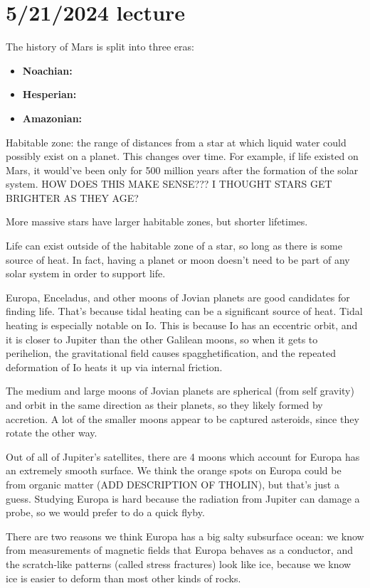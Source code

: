 \documentclass[class=article, crop=false]{standalone}
\begin{document}
\section{5/21/2024 lecture}
The history of Mars is split into three eras:
\begin{itemize}
    \item \textbf{Noachian:}
    \item \textbf{Hesperian:}
    \item \textbf{Amazonian:}
\end{itemize}
Habitable zone: the range of distances from a star at which liquid water could possibly exist on a planet. This changes over time. For example, if life existed on Mars, it would've been only for 500 million years after the formation of the solar system. HOW DOES THIS MAKE SENSE??? I THOUGHT STARS GET BRIGHTER AS THEY AGE?
\par
More massive stars have larger habitable zones, but shorter lifetimes.
\par
Life can exist outside of the habitable zone of a star, so long as there is some source of heat. In fact, having a planet or moon doesn't need to be part of any solar system in order to support life.
\par
Europa, Enceladus, and other moons of Jovian planets are good candidates for finding life. That's because tidal heating can be a significant source of heat. Tidal heating is especially notable on Io. This is because Io has an eccentric orbit, and it is closer to Jupiter than the other Galilean moons, so when it gets to perihelion, the gravitational field causes spagghetification, and the repeated deformation of Io heats it up via internal friction.
\par
The medium and large moons of Jovian planets are spherical (from self gravity) and orbit in the same direction as their planets, so they likely formed by accretion. A lot of the smaller moons appear to be captured asteroids, since they rotate the other way.
\par
Out of all of Jupiter's satellites, there are 4 moons which account for 
Europa has an extremely smooth surface. We think the orange spots on Europa could be from organic matter (ADD DESCRIPTION OF THOLIN), but that's just a guess. Studying Europa is hard because the radiation from Jupiter can damage a probe, so we would prefer to do a quick flyby.
\par
There are two reasons we think Europa has a big salty subsurface ocean: we know from measurements of magnetic fields that Europa behaves as a conductor, and the scratch-like patterns (called stress fractures) look like ice, because we know ice is easier to deform than most other kinds of rocks.
\end{document}
